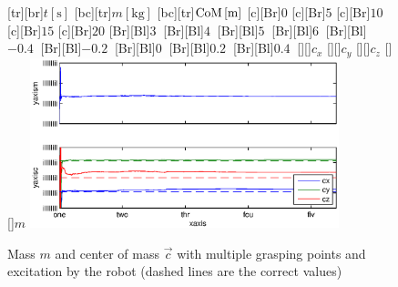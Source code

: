 \begin{figure}
	\centering	
	[tr][br]{$t\left[\mathrm{s}\right]$}
	[bc][tr]{$m\left[\mathrm{kg}\right]$}
	[bc][tr]{$\mathrm{CoM}\left[\mathrm{m}\right]$}
	[Br]{$0$}
	[Br]{$5$}
	[Br]{$10$}
	[Br]{$15$}
	[Br]{$20$}
	[Br][Bl]{$3\  $}
	[Br][Bl]{$4\ $}
	[Br][Bl]{$5\  $}
	[Br][Bl]{$6\  $}
	[Br][Bl]{$-0.4\  $}
	[Br][Bl]{$-0.2\ $}
	[Br][Bl]{$0\  $}
	[Br][Bl]{$0.2\  $}
	[Br][Bl]{$0.4\  $}
	[][]{\tiny $c_x$}
	[][]{\tiny $c_y$}
	[][]{\tiny $c_z$}
	[][]{\tiny $m$}
	\includegraphics[width=0.8\textwidth]{figures/multiple_grasping_points_robot_mass_and_cog.eps}
	\vspace{0.2cm}
	\caption[Mass error, multiple grasping points, excitation by robot]{Mass $m$ and center of mass $\vec{c}$ with multiple grasping points and excitation by the robot (dashed lines are the correct values)}
	\label{fig:estim_mass_multi_robot}
\end{figure}

